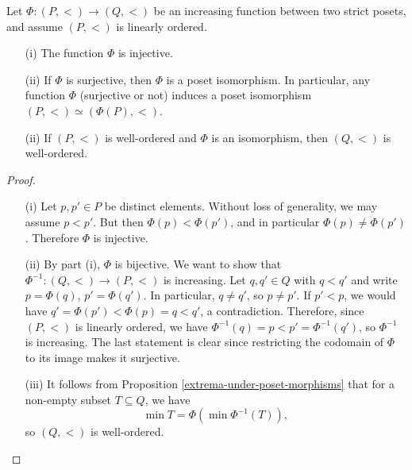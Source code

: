 \begin{proposition} \label{morphisms-of-linearly-ordered-posets}
    Let $\Phi : (P, <) \to (Q,<)$ be an increasing function between two strict posets, and assume $(P,<)$ is linearly ordered.
    \\

    \begin{itemize}
        \item[(i)] The function $\Phi$ is injective.
        \\

        \item[(ii)] If $\Phi$ is surjective, then $\Phi$ is a poset isomorphism. In particular, any function $\Phi$ (surjective or not) induces a poset isomorphism $(P, <) \simeq (\Phi(P), <)$.
        \\

        \item[(ii)] If $(P,<)$ is well-ordered and $\Phi$ is an isomorphism, then $(Q,<)$ is well-ordered.
        \\

    \end{itemize}
\end{proposition}

\begin{proof}
    \begin{itemize}
        \item[(i)] Let $p,p' \in P$ be distinct elements. Without loss of generality, we may assume $p < p'$. But then $\Phi(p) < \Phi(p')$, and in particular $\Phi(p) \neq \Phi(p')$. Therefore $\Phi$ is injective.
        \\

        \item[(ii)] By part (i), $\Phi$ is bijective. We want to show that $\Phi^{-1} : (Q,<) \to (P,<)$ is increasing. Let $q,q' \in Q$ with $q < q'$ and write $p = \Phi(q)$, $p' = \Phi(q')$. In particular, $q \neq q'$, so $p \neq p'$. If $p' < p$, we would have $q' = \Phi(p') < \Phi(p) = q < q'$, a contradiction. Therefore, since $(P,<)$ is linearly ordered, we have $\Phi^{-1}(q) = p < p' = \Phi^{-1}(q')$, so $\Phi^{-1}$ is increasing. The last statement is clear since restricting the codomain of $\Phi$ to its image makes it surjective.
        \\

        \item[(iii)] It follows from Proposition \autoref{extrema-under-poset-morphisms} that for a non-empty subset $T \subseteq Q$, we have 
        \[
            \min T = \Phi(\min \Phi^{-1}(T)),   
        \]
        so $(Q,<)$ is well-ordered.
        \\

    \end{itemize}
\end{proof}

